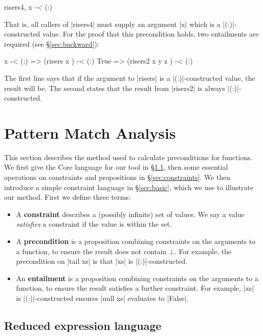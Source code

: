 \documentclass[preprint]{sigplanconf}
\begin{document}
\ignore\begin{code}
risers4, x -< (:)
\end{code}

\noindent That is, all callers of |risers4| must supply an argument |x| which is a |(:)|-constructed value. For the proof that this precondition holds, two entailments are required (see \S\ref{sec:backward}):

\ignore\begin{code}
x -< (:)  => (risers x       ) -< (:)
True      => (risers2 x y z  ) -< (:)
\end{code}

\noindent The first line says that if the argument to |risers| is a |(:)|-constructed value, the result will be. The second states that the result from |risers2| is always |(:)|-constructed.



\section{Pattern Match Analysis}
\label{sec:manipulate}

This section describes the method used to calculate preconditions for functions. We first give the Core language for our tool in \S\ref{sec:core}, then some essential operations on constraints and propositions in \S\ref{sec:constraints}. We then introduce a simple constraint language in \S\ref{sec:basic}, which we use to illustrate our method. First we define three terms:

\begin{itemize}
\item A \textbf{constraint} describes a (possibly infinite) set of values. We say a value \textit{satisfies} a constraint if the value is within the set.
\item A \textbf{precondition} is a proposition combining constraints on the arguments to a function, to ensure the result does not contain $\bot{}$. For example, the precondition on |tail xs| is that |xs| is |(:)|-constructed.
\item An \textbf{entailment}  is a proposition combining constraints on the arguments to a function, to ensure the result satisfies a further constraint. For example, |xs| is |(:)|-constructed ensures |null xs| evaluates to |False|.
\end{itemize}

\subsection{Reduced expression language}
\label{sec:core}
\end{document}
